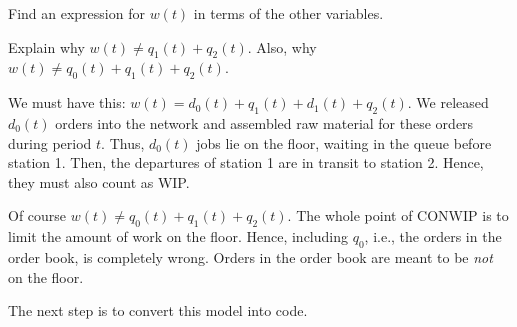 \begin{exercise}
  Find an expression for $w(t)$ in terms of the other variables. 

  
\begin{hint}

  Explain why $w(t) \neq q_1(t) + q_2(t)$.
  Also, why $w(t) \neq q_0(t) + q_1(t) + q_2(t)$.
\end{hint}

\begin{solution}
    We must have this: $w(t) = d_0(t) + q_1(t) + d_1(t) + q_2(t)$.
    We released $d_0(t)$ orders into the network and assembled raw material for these orders during period $t$.
    Thus, $d_0(t)$ jobs lie on the floor, waiting in the queue before station 1.
    Then, the departures of station 1 are in transit to station 2.
    Hence, they must also count as WIP.


    Of course $w(t) \neq q_0(t) + q_1(t) + q_2(t)$.
    The whole point of CONWIP is to limit the amount of work on the floor.
    Hence, including $q_0$, i.e., the orders in the order book, is completely wrong.
    Orders in the order book are meant to be \emph{not} on the floor.
    \end{solution}
\end{exercise}


The next step is to convert this model into code. 


